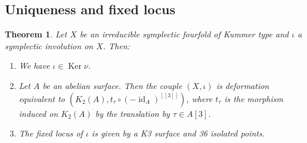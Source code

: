 \documentclass{alggeom}
\DeclareMathOperator{\id}{id}
\DeclareMathOperator{\Ker}{Ker}
\theoremstyle{plain}
\newtheorem{thm}[theorem]{Theorem}
\theoremstyle{definition}
\theoremstyle{remark}
\begin{document}
\subsection{Uniqueness and fixed locus}
\begin{thm}\label{SymplecticInvo}
Let $X$ be an irreducible symplectic fourfold of Kummer type and $\iota$ a symplectic involution on $X$. Then:
\begin{enumerate}
\item
We have $\iota\in \Ker \nu$.
\item
Let $A$ be an abelian surface. Then 
the couple $(X,\iota)$ is deformation equivalent to $(K_2(A),t_\tau \circ (-\id_A)^{[[3]]})$,
where $t_\tau$ is the morphism induced on $K_2(A)$ by the translation by $\tau\in A[3]$.
\item
The fixed locus of $\iota$ is given by a K3 surface and 36 isolated points.
\end{enumerate}
\end{thm}
\end{document}
